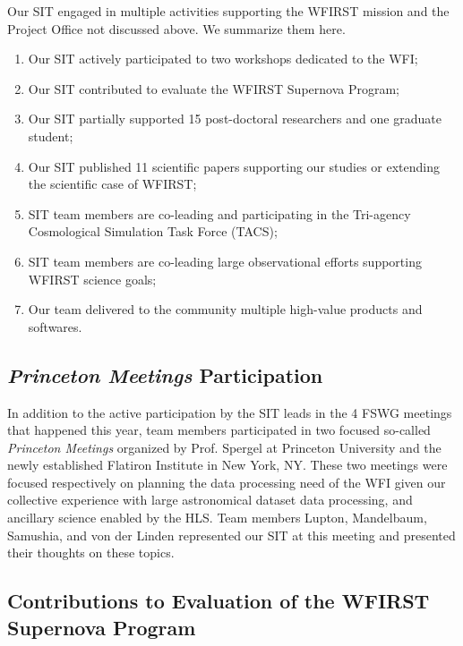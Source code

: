 

\begin{summary}
Our SIT engaged in multiple activities supporting the WFIRST mission and the Project Office not discussed above. We summarize them here.
\begin{enumerate}
\item Our SIT actively participated to two workshops dedicated to the WFI;
\item Our SIT contributed to evaluate the WFIRST Supernova Program;
\item Our SIT partially supported 15 post-doctoral researchers and one graduate student;
\item Our SIT published 11 scientific papers supporting our studies or extending the scientific case of WFIRST;
\item SIT team members are co-leading and participating in the Tri-agency Cosmological Simulation Task Force (TACS);
\item SIT team members are co-leading large observational efforts supporting WFIRST science goals;
\item Our team delivered to the community multiple high-value products and softwares.
\end{enumerate}
\end{summary}


\subsection{\emph{Princeton Meetings} Participation}

In addition to the active participation by the SIT leads in the 4 FSWG meetings that happened this year, team members participated in two focused so-called \emph{Princeton Meetings} organized by Prof. Spergel at Princeton University and  the newly established Flatiron Institute in  New York, NY. These two meetings were focused respectively on planning the data processing need of the WFI given our collective experience with large astronomical dataset data processing, and ancillary science enabled by the HLS. Team members Lupton, Mandelbaum, Samushia, and von der Linden represented our SIT at this meeting and presented their thoughts on these topics.

\subsection{Contributions to Evaluation of the WFIRST Supernova Program}

